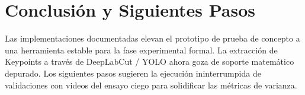 \documentclass[12pt,a4paper]{article}
\begin{document}
\section{Conclusión y Siguientes Pasos}
Las implementaciones documentadas elevan el prototipo de prueba de concepto a una herramienta estable para la fase experimental formal. La extracción de Keypoints a través de DeepLabCut / YOLO ahora goza de soporte matemático depurado. Los siguientes pasos sugieren la ejecución ininterrumpida de validaciones con videos del ensayo ciego para solidificar las métricas de varianza.
\end{document}
